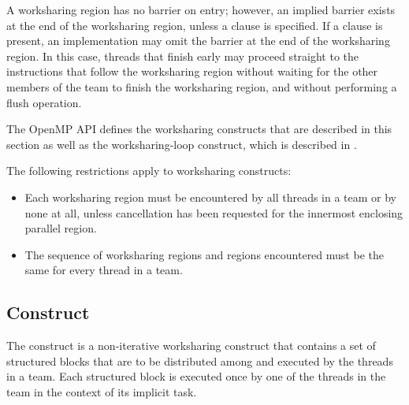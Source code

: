 A worksharing region has no barrier on entry; however, an implied barrier exists at 
the end of the worksharing region, unless a  clause is specified. If a 
 clause is present, an implementation may omit the barrier at the end 
of the worksharing region. In this case, threads that finish early may proceed 
straight to the instructions that follow the worksharing region without waiting for 
the other members of the team to finish the worksharing region, and without 
performing a flush operation.

The OpenMP API defines the worksharing constructs that are described in this section
as well as the worksharing-loop construct, which is described in 
.

\begin{samepage}
\restrictions
The following restrictions apply to worksharing constructs:

\begin{itemize}
\item Each worksharing region must be encountered by all threads in a team or by none at
all, unless cancellation has been requested for the innermost enclosing parallel
region.

\item The sequence of worksharing regions and  regions encountered must be the
same for every thread in a team.
\end{itemize}
\end{samepage}



\subsection{ Construct}
\label{subsec:sections Construct}
\summary
The  construct is a non-iterative worksharing construct that 
contains a set of structured blocks that are to be distributed among and 
executed by the threads in a team. Each structured block is executed once by 
one of the threads in the team in the context of its implicit task.

